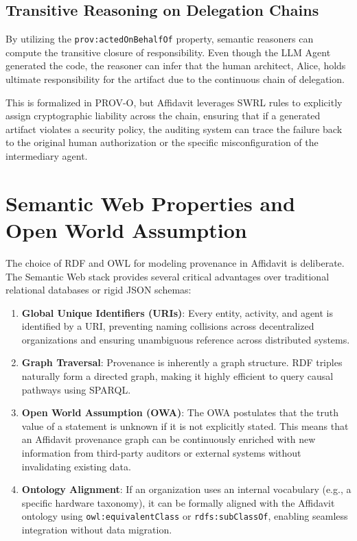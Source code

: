 \subsection{Transitive Reasoning on Delegation Chains}

By utilizing the \texttt{prov:actedOnBehalfOf} property, semantic reasoners can compute the transitive closure of responsibility. Even though the LLM Agent generated the code, the reasoner can infer that the human architect, Alice, holds ultimate responsibility for the artifact due to the continuous chain of delegation.

This is formalized in PROV-O, but Affidavit leverages SWRL rules to explicitly assign cryptographic liability across the chain, ensuring that if a generated artifact violates a security policy, the auditing system can trace the failure back to the original human authorization or the specific misconfiguration of the intermediary agent.

\section{Semantic Web Properties and Open World Assumption}

The choice of RDF and OWL for modeling provenance in Affidavit is deliberate. The Semantic Web stack provides several critical advantages over traditional relational databases or rigid JSON schemas:

\begin{enumerate}
    \item \textbf{Global Unique Identifiers (URIs)}: Every entity, activity, and agent is identified by a URI, preventing naming collisions across decentralized organizations and ensuring unambiguous reference across distributed systems.
    \item \textbf{Graph Traversal}: Provenance is inherently a graph structure. RDF triples naturally form a directed graph, making it highly efficient to query causal pathways using SPARQL.
    \item \textbf{Open World Assumption (OWA)}: The OWA postulates that the truth value of a statement is unknown if it is not explicitly stated. This means that an Affidavit provenance graph can be continuously enriched with new information from third-party auditors or external systems without invalidating existing data.
    \item \textbf{Ontology Alignment}: If an organization uses an internal vocabulary (e.g., a specific hardware taxonomy), it can be formally aligned with the Affidavit ontology using \texttt{owl:equivalentClass} or \texttt{rdfs:subClassOf}, enabling seamless integration without data migration.
\end{enumerate}

